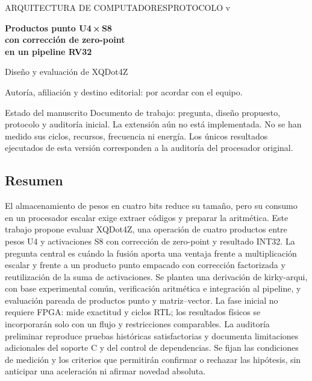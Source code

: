 \documentclass[11pt]{article}
\begin{document}
\thispagestyle{empty}
{\sffamily\small\color{nord10} ARQUITECTURA DE COMPUTADORES\hfill PROTOCOLO v\ProjectVersion\par}
\vspace{8mm}
{\raggedright\sffamily\bfseries\fontsize{25}{30}\selectfont Productos punto U4\,×\,S8\\con corrección de zero-point\\en un pipeline RV32\par}
\vspace{4mm}
{\sffamily\Large\color{nord3} Diseño y evaluación de XQDot4Z\par}
\vspace{4mm}
{\sffamily\small\ProjectDate\par}
{\small Autoría, afiliación y destino editorial: por acordar con el equipo.\par}
\begin{statusbox}{Estado del manuscrito}
Documento de trabajo: pregunta, diseño propuesto, protocolo y auditoría inicial.
La extensión aún no está implementada. No se han medido sus ciclos, recursos,
frecuencia ni energía. Los únicos resultados ejecutados de esta versión
corresponden a la auditoría del procesador original.
\end{statusbox}
\subsection*{Resumen}
El almacenamiento de pesos en cuatro bits reduce su tamaño, pero su consumo
en un procesador escalar exige extraer códigos y preparar la aritmética. Este
trabajo propone evaluar XQDot4Z, una operación de cuatro productos entre pesos
U4 y activaciones S8 con corrección de zero-point y resultado INT32. La pregunta
central es cuándo la fusión aporta una ventaja frente a multiplicación escalar
y frente a un producto punto empacado con corrección factorizada y reutilización
de la suma de activaciones. Se plantea una derivación de kirky-arqui, con base
experimental común, verificación aritmética e integración al pipeline, y
evaluación pareada de productos punto y matriz--vector. La fase inicial no
requiere FPGA: mide exactitud y ciclos RTL; los resultados físicos se incorporarán
solo con un flujo y restricciones comparables. La auditoría preliminar reproduce
\HistoricalPass{} pruebas históricas satisfactorias y documenta limitaciones
adicionales del soporte C y del control de dependencias. Se fijan las condiciones
de medición y los criterios que permitirán confirmar o rechazar las hipótesis,
sin anticipar una aceleración ni afirmar novedad absoluta.
\end{document}
